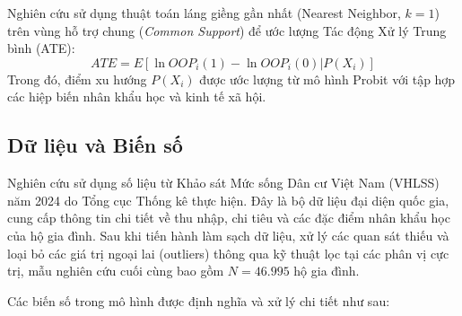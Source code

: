 \documentclass[12pt,a4paper]{article}
\begin{document}
Nghiên cứu sử dụng thuật toán láng giềng gần nhất (Nearest Neighbor, $k=1$) trên vùng hỗ trợ chung (\textit{Common Support}) để ước lượng Tác động Xử lý Trung bình (ATE):
\begin{equation}
	ATE = E[\ln OOP_i(1) - \ln OOP_i(0) | P(X_i)]
\end{equation}
Trong đó, điểm xu hướng $P(X_i)$ được ước lượng từ mô hình Probit với tập hợp các hiệp biến nhân khẩu học và kinh tế xã hội.

\subsection{Dữ liệu và Biến số}

Nghiên cứu sử dụng số liệu từ Khảo sát Mức sống Dân cư Việt Nam (VHLSS) năm 2024 do Tổng cục Thống kê thực hiện. Đây là bộ dữ liệu đại diện quốc gia, cung cấp thông tin chi tiết về thu nhập, chi tiêu và các đặc điểm nhân khẩu học của hộ gia đình. Sau khi tiến hành làm sạch dữ liệu, xử lý các quan sát thiếu và loại bỏ các giá trị ngoại lai (outliers) thông qua kỹ thuật lọc tại các phân vị cực trị, mẫu nghiên cứu cuối cùng bao gồm $N = 46.995$ hộ gia đình.

Các biến số trong mô hình được định nghĩa và xử lý chi tiết như sau:
\end{document}
